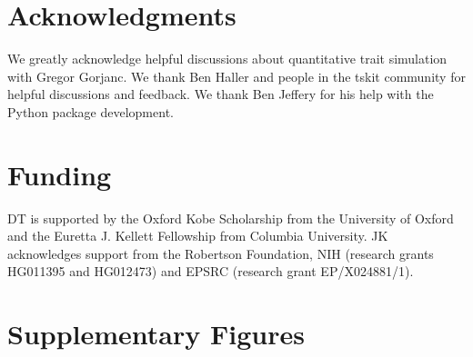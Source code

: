 \documentclass[unnumsec,webpdf,modern,large,namedate]{oup-authoring-template}%
\begin{document}
\section{Acknowledgments}

We greatly acknowledge helpful discussions about quantitative trait simulation
with Gregor Gorjanc. We thank Ben Haller and people in the tskit community for
helpful discussions and feedback. We thank Ben Jeffery for his help with the
Python package development.

\section{Funding}
DT is supported by the Oxford Kobe Scholarship from the University of Oxford
and the Euretta J. Kellett Fellowship from Columbia University.
JK acknowledges support from the Robertson Foundation,
NIH (research grants HG011395 and HG012473) and
EPSRC (research grant EP/X024881/1).





\clearpage

\renewcommand\thefigure{S\arabic{figure}}
\setcounter{figure}{0}
\renewcommand\thetable{S\arabic{table}}
\setcounter{table}{0}
\section{Supplementary Figures}
\end{document}
